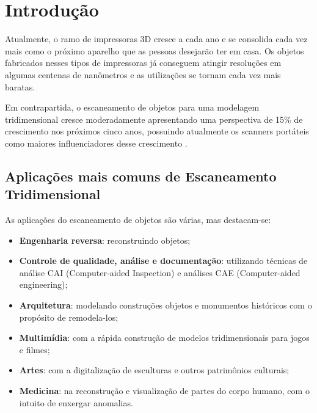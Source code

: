 \chapter{Introdução} %
\thispagestyle{empty}

Atualmente, o ramo de impressoras 3D cresce a cada ano e se consolida cada vez mais como o próximo aparelho que as pessoas desejarão ter em casa. Os objetos fabricados nesses tipos de impressoras já conseguem atingir resoluções em algumas centenas de nanômetros e as utilizações se tornam cada vez mais baratas.

Em contrapartida, o escaneamento de objetos para uma modelagem tridimensional cresce moderadamente apresentando uma perspectiva de 15\% de crescimento nos próximos cinco anos, possuindo atualmente os scanners portáteis como maiores influenciadores desse crescimento \cite{creaform_ebooks_introduction_2015}. 

\section{Aplicações mais comuns de Escaneamento Tridimensional}

As aplicações do escaneamento de objetos são várias, mas destacam-se:

\begin{itemize}
\item \textbf{Engenharia reversa}: reconstruindo objetos;

\item \textbf{Controle de qualidade, análise e documentação}: utilizando técnicas de análise CAI (Computer-aided Inspection) e análises CAE (Computer-aided engineering);

\item \textbf{Arquitetura}: modelando construções objetos e monumentos históricos com o propósito de remodela-los;

\item \textbf{Multimídia}: com a rápida construção de modelos tridimensionais para jogos e  filmes;

\item \textbf{Artes}: com a digitalização de esculturas e outros patrimônios culturais;

\item \textbf{Medicina}: na reconstrução e visualização de partes do corpo humano, com o intuito de enxergar anomalias.
\end{itemize}

